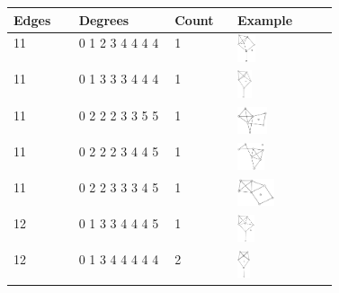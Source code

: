 \begin{footnotesize}
\begin{longtable}{m{0.07\linewidth} m{0.15\linewidth} m{0.05\linewidth} m{0.15\linewidth}}
\toprule
Edges & Degrees & Count & Example\\ [0.5ex]
\midrule
11 & 0 1 2 3 4 4 4 4 & 1 & \includegraphics[height=0.8cm]{15-universal-graphs/img/degree-sequences-example-graphs/graph-4-8-0}\\
11 & 0 1 3 3 3 4 4 4 & 1 & \includegraphics[height=0.8cm]{15-universal-graphs/img/degree-sequences-example-graphs/graph-4-8-1}\\
11 & 0 2 2 2 3 3 5 5 & 1 & \includegraphics[height=0.8cm]{15-universal-graphs/img/degree-sequences-example-graphs/graph-4-8-2}\\
11 & 0 2 2 2 3 4 4 5 & 1 & \includegraphics[height=0.8cm]{15-universal-graphs/img/degree-sequences-example-graphs/graph-4-8-3}\\
11 & 0 2 2 3 3 3 4 5 & 1 & \includegraphics[height=0.8cm]{15-universal-graphs/img/degree-sequences-example-graphs/graph-4-8-4}\\
12 & 0 1 3 3 4 4 4 5 & 1 & \includegraphics[height=0.8cm]{15-universal-graphs/img/degree-sequences-example-graphs/graph-4-8-5}\\
12 & 0 1 3 4 4 4 4 4 & 2 & \includegraphics[height=0.8cm]{15-universal-graphs/img/degree-sequences-example-graphs/graph-4-8-6}\\

\end{longtable}
\end{footnotesize}
